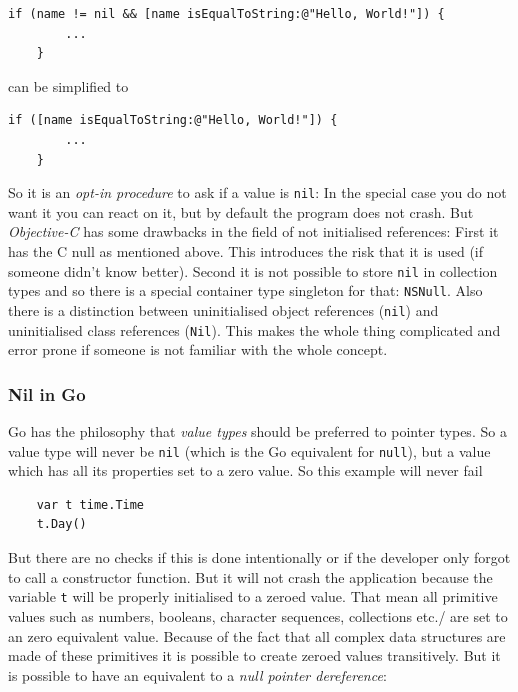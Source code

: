 \documentclass[11pt, a4paper]{report}
\begin{document}
\begin{lstlisting}[language={[Objective]C}]
    if (name != nil && [name isEqualToString:@"Hello, World!"]) {
        ...
    }
\end{lstlisting}

\noindent can be simplified to

\begin{lstlisting}[language={[Objective]C}]
    if ([name isEqualToString:@"Hello, World!"]) { 
        ...
    }
\end{lstlisting}

\noindent So it is an \textit{opt-in procedure} to ask if a value is \texttt{nil}: In the special case you do not want it you can react on it, but by default the program does not crash. But \textit{Objective-C} has some drawbacks in the field of not initialised references: First it has the C null as mentioned above. This introduces the risk that it is used (if someone didn't know better). Second it is not possible to store \texttt{nil} in collection types and so there is a special container type singleton for that: \texttt{NSNull}. Also there is a distinction between uninitialised object references (\texttt{nil}) and uninitialised class references (\texttt{Nil}). This makes the whole thing complicated and error prone if someone is not familiar with the whole concept.

\subsubsection{Nil in Go}
Go has the philosophy that \textit{value types} should be preferred to pointer types. So a value type will never be \texttt{nil} (which is the Go equivalent for \texttt{null}), but a value which has all its properties set to a zero value\cite{golang-spec}. So this example will never fail

\begin{lstlisting}
    var t time.Time
    t.Day()
\end{lstlisting}

\noindent But there are no checks if this is done intentionally or if the developer only forgot to call a constructor function. But it will not crash the application because the variable \texttt{t} will be properly initialised to a zeroed value. That mean all primitive values such as numbers, booleans, character sequences, collections etc./ are set to an zero equivalent value. Because of the fact that all complex data structures are made of these primitives it is possible to create zeroed values transitively. But it is possible to have an equivalent to a \textit{null pointer dereference}:
\end{document}
